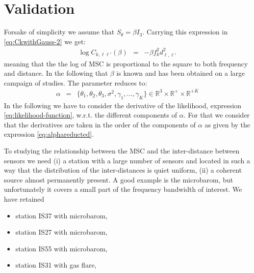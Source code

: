 \documentclass[a4paper, 12pt]{report}
\begin{document}
 \section{Validation}
Forsake of simplicity we assume that $S_{\theta}=\beta I_{3}$. Carrying this expression in  \eqref{eq:CkwithGauss-2} we get:
\begin{eqnarray}
 \label{eq:logCkwithcauchy}
 \log C_{k,\ell\ell'} (\beta)&=& -\beta f_k^2 d_{\ell,\ell'}^2
\end{eqnarray}
meaning that the the log of MSC is proportional to the square to both frequency and  distance. In the following that $\beta$ is known and has been obtained on a large campaign of studies. The parameter reduces to:
\begin{eqnarray}
 \label{eq:alphareducted}
\alpha&=&
\{
\theta_{1},\theta_{2},\theta_{3},\sigma^{2},\gamma_{1},\ldots,\gamma_{K}
\}
\in \mathds{R}^{3}\times   \mathds{R}^{+}\times\mathds{R}^{+K}
\end{eqnarray}
In the following we have to consider the derivative of the likelihood, expression \eqref{eq:likelihood-function}, w.r.t. the different components of $\alpha$. For that we consider that the derivatives are taken in the order of the components of $\alpha$ as given by the expression \eqref{eq:alphareducted}.

To studying the relationship between the MSC and the inter-distance between sensors we need (i) a  station with a large number of sensors and located in such a way that the distribution of the inter-distances is quiet  uniform, (ii) a coherent source almost permanently present. A good example is the microbarom, but unfortunately it covers a small part of the frequency bandwidth of interest. We have retained
\begin{itemize}
\item
station IS37 with microbarom,
\item
station IS27 with microbarom,
\item
station IS55 with microbarom,
\item
station IS31 with gas flare,
\end{itemize}


\end{document}
